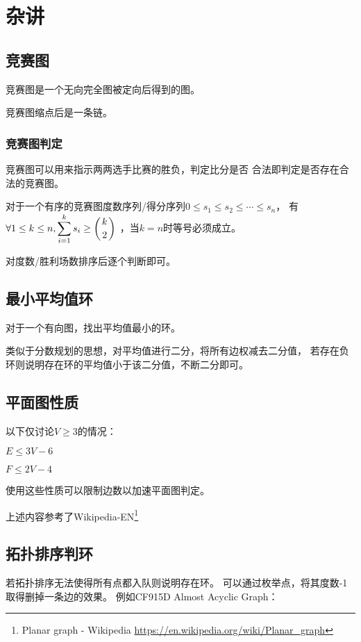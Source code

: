 \section{杂讲}
\subsection{竞赛图}
竞赛图是一个无向完全图被定向后得到的图。
\begin{theorem}
	竞赛图缩点后是一条链。
\end{theorem}
\subsubsection{竞赛图判定}
竞赛图可以用来指示两两选手比赛的胜负，判定比分是否
合法即判定是否存在合法的竞赛图。
\begin{theorem}
	对于一个有序的竞赛图度数序列/得分序列$0\leq s_1 \leq s_2 \leq \cdots \leq s_n$，
	有$\displaystyle \forall 1\leq k\leq n,\sum_{i=1}^k{s_i}\geq \left(k \atop 2\right)$
	，当$k=n$时等号必须成立。
\end{theorem}
对度数/胜利场数排序后逐个判断即可。
\subsection{最小平均值环}
对于一个有向图，找出平均值最小的环。

类似于分数规划的思想，对平均值进行二分，将所有边权减去二分值，
若存在负环则说明存在环的平均值小于该二分值，不断二分即可。
\subsection{平面图性质}
以下仅讨论$V\geq 3$的情况：
\begin{property}
	$E\leq 3V-6$
\end{property}
\begin{property}
	$F\leq 2V-4$
\end{property}
使用这些性质可以限制边数以加速平面图判定。

上述内容参考了Wikipedia-EN\footnote{Planar graph - Wikipedia
	\url{https://en.wikipedia.org/wiki/Planar\_graph}
}
\subsection{拓扑排序判环}
若拓扑排序无法使得所有点都入队则说明存在环。
可以通过枚举点，将其度数-1取得删掉一条边的效果。
例如CF915D Almost Acyclic Graph：

